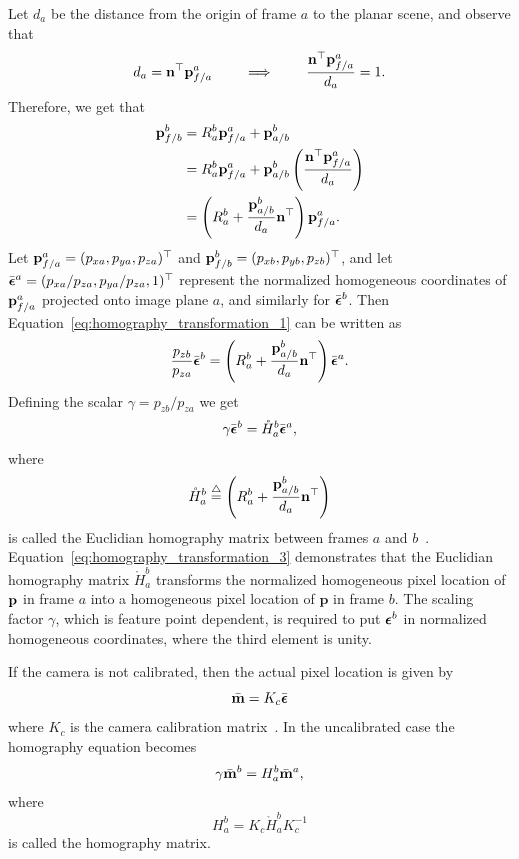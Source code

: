 Let $d_a$ be the distance from the origin of frame $a$ to the planar scene, and observe that
\[
d_a = \mathbf{n}^\top \mathbf{p}_{f/a}^a \qquad \implies \qquad \frac{\mathbf{n}^\top \mathbf{p}_{f/a}^a}{d_a} = 1.
\]
Therefore, we get that
\begin{align}
\pbf_{f/b}^b &= R_a^b \pbf_{f/a}^a + \pbf_{a/b}^b \notag \\
			 &= R_a^b \pbf_{f/a}^a + \pbf_{a/b}^b\left(\frac{\nbf^\top \pbf_{f/a}^a}{d_a}\right) \notag \\
			 &= \left(R_a^b  + \frac{\pbf_{a/b}^b}{d_a}\nbf^\top \right) \pbf_{f/a}^a.
			 \label{eq:homography_transformation_1}
\end{align}
Let $\mathbf{p}_{f/a}^a = (p_{xa}, p_{ya}, p_{za})^\top$ and $\mathbf{p}_{f/b}^b = (p_{xb}, p_{yb}, p_{zb})^\top$, and let $\bar{\boldsymbol{\epsilon}}^a = (p_{xa}/p_{za}, p_{ya}/p_{za}, 1)^\top$ represent the normalized homogeneous coordinates of $\mathbf{p}_{f/a}^a$ projected onto image plane $a$, and similarly for $\bar{\boldsymbol{\epsilon}}^b$.  Then Equation~\eqref{eq:homography_transformation_1} can be written as
\begin{equation}\label{eq:homography_transformation_2}
\frac{p_{zb}}{p_{za}} \bar{\epsilonbf}^b = \left(R_a^b  + \frac{\pbf_{a/b}^b}{d_a}\nbf^\top \right)\bar{\epsilonbf}^a.
\end{equation}
Defining the scalar $\gamma = p_{zb}/p_{za}$ we get
\begin{equation}\label{eq:homography_transformation_3}
\gamma \bar{\epsilonbf}^b = \mathring{H}_a^b\bar{\epsilonbf}^a,
\end{equation}
where 
\begin{equation}\label{eq:euclidian_homography}
\mathring{H}_a^b \defeq \left(R_a^b  + \frac{\pbf_{a/b}^b}{d_a}\nbf^\top \right)
\end{equation}
is called the Euclidian homography matrix between frames $a$ and $b$~\cite{KaiserGansDixon10}.
Equation~\eqref{eq:homography_transformation_3} demonstrates that the Euclidian homography matrix $\mathring{H}_a^b$ transforms the normalized homogeneous pixel location of $\mathbf{p}$ in frame $a$ into a homogeneous pixel location of $\mathbf{p}$ in frame $b$.  The scaling factor $\gamma$, which is feature point dependent, is required to put $\boldsymbol{\epsilon}^b$ in normalized homogeneous coordinates, where the third element is unity.




If the camera is not calibrated, then the actual pixel location is given by 
\[
\bar{\mathbf{m}} = K_c \bar{\boldsymbol{\epsilon}}
\]
where $K_c$ is the camera calibration matrix~\cite{MaSoattoKoseckaSastry03}.  In the uncalibrated case the homography equation becomes
\begin{equation}\label{eq:homography_transformation_uncalibrated}
\gamma \bar{\mbf}^b = H_a^b \bar{\mbf}^a,
\end{equation}
where 
\[
H_a^b = K_c \mathring{H}_a^b K_c^{-1}
\] 
is called the homography matrix.  

